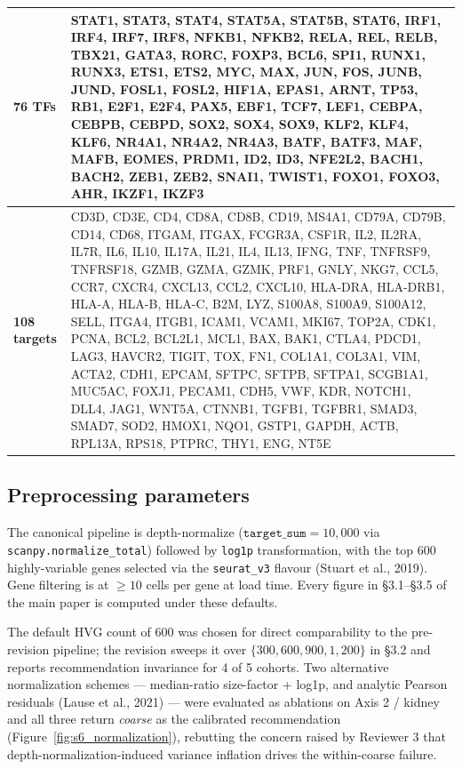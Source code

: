 \documentclass[a4paper,11pt]{article}
\begin{document}
\begin{table}[ht]
\begin{tabularx}{\textwidth}{l X}
\toprule
\textbf{76 TFs} &
STAT1, STAT3, STAT4, STAT5A, STAT5B, STAT6,
IRF1, IRF4, IRF7, IRF8,
NFKB1, NFKB2, RELA, REL, RELB,
TBX21, GATA3, RORC, FOXP3, BCL6,
SPI1, RUNX1, RUNX3, ETS1, ETS2,
MYC, MAX, JUN, FOS, JUNB, JUND, FOSL1, FOSL2,
HIF1A, EPAS1, ARNT,
TP53, RB1, E2F1, E2F4,
PAX5, EBF1, TCF7, LEF1,
CEBPA, CEBPB, CEBPD,
SOX2, SOX4, SOX9,
KLF2, KLF4, KLF6,
NR4A1, NR4A2, NR4A3,
BATF, BATF3, MAF, MAFB,
EOMES, PRDM1, ID2, ID3,
NFE2L2, BACH1, BACH2,
ZEB1, ZEB2, SNAI1, TWIST1,
FOXO1, FOXO3, AHR,
IKZF1, IKZF3 \\
\midrule
\textbf{108 targets} &
CD3D, CD3E, CD4, CD8A, CD8B, CD19, MS4A1, CD79A, CD79B,
CD14, CD68, ITGAM, ITGAX, FCGR3A, CSF1R,
IL2, IL2RA, IL7R, IL6, IL10, IL17A, IL21, IL4, IL13,
IFNG, TNF, TNFRSF9, TNFRSF18,
GZMB, GZMA, GZMK, PRF1, GNLY, NKG7,
CCL5, CCR7, CXCR4, CXCL13, CCL2, CXCL10,
HLA-DRA, HLA-DRB1, HLA-A, HLA-B, HLA-C, B2M,
LYZ, S100A8, S100A9, S100A12,
SELL, ITGA4, ITGB1, ICAM1, VCAM1,
MKI67, TOP2A, CDK1, PCNA,
BCL2, BCL2L1, MCL1, BAX, BAK1,
CTLA4, PDCD1, LAG3, HAVCR2, TIGIT, TOX,
FN1, COL1A1, COL3A1, VIM, ACTA2,
CDH1, EPCAM, SFTPC, SFTPB, SFTPA1, SCGB1A1, MUC5AC, FOXJ1,
PECAM1, CDH5, VWF, KDR, NOTCH1, DLL4, JAG1,
WNT5A, CTNNB1,
TGFB1, TGFBR1, SMAD3, SMAD7,
SOD2, HMOX1, NQO1, GSTP1,
GAPDH, ACTB, RPL13A, RPS18,
PTPRC, THY1, ENG, NT5E \\
\bottomrule
\end{tabularx}
\end{table}

\subsection{Preprocessing parameters}

The canonical pipeline is depth-normalize ($\texttt{target\_sum} = 10{,}000$
via \texttt{scanpy.normalize\_total}) followed by \texttt{log1p}
transformation, with the top 600 highly-variable genes selected via the
\texttt{seurat\_v3} flavour (Stuart et al., 2019). Gene filtering is at
$\geq 10$ cells per gene at load time. Every figure in \S3.1--\S3.5 of
the main paper is computed under these defaults.

The default HVG count of 600 was chosen for direct comparability to
the pre-revision pipeline; the revision sweeps it over
$\{300, 600, 900, 1{,}200\}$ in \S3.2 and reports recommendation
invariance for 4 of 5 cohorts. Two alternative normalization schemes ---
median-ratio size-factor + log1p, and analytic Pearson residuals
(Lause et al., 2021) --- were evaluated as ablations on Axis 2 / kidney
and all three return \emph{coarse} as the calibrated recommendation
(Figure~\ref{fig:s6_normalization}), rebutting the concern raised by
Reviewer 3 that depth-normalization-induced variance inflation drives
the within-coarse failure.
\end{document}
